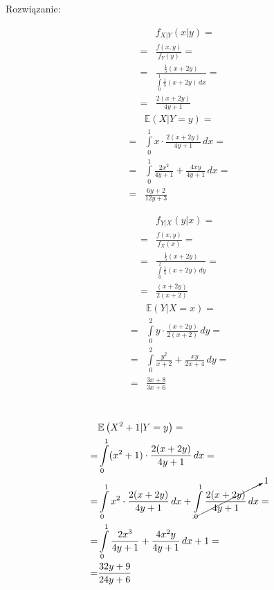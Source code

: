 Rozwiązanie:\\
\begin{minipage}[t]{0.5\linewidth}
\begin{align*}
&f_{X|Y}(x|y)
=\\=&
\frac{f(x,y)}{f_Y(y)}
=\\=&
\frac{\frac{1}{5}(x+2y)}{\int\limits_{0}^{1}\frac{1}{5}(x+2y)\,dx}
=\\=&
\frac{2(x+2y)}{4 y+1}
\end{align*}
\begin{align*}
&\mathbb E \left(X|Y=y\right)
=\\=&
\int\limits_{0}^{1}x\cdot \frac{2(x+2y)}{4 y+1}\,dx
=\\=&
\int\limits_{0}^{1}\frac{2 x^2}{4 y+1}+\frac{4 x y}{4 y+1}\,dx
=\\=&
\frac{6 y+2}{12 y+3}
\end{align*}
\end{minipage}
\begin{minipage}[t]{0.5\linewidth}
\begin{align*}
&f_{Y|X}(y|x)
=\\=&
\frac{f(x,y)}{f_X(x)}
=\\=&
\frac{\frac{1}{5}(x+2y)}{\int\limits_{0}^{2}\frac{1}{5}(x+2y)\,dy}
=\\=&
\frac{(x+2y)}{2 (x+2)}
\end{align*}
\begin{align*}
&\mathbb E \left(Y|X=x\right)
=\\=&
\int\limits_{0}^{2}y\cdot \frac{(x+2y)}{2 (x+2)}\,dy
=\\=&
\int\limits_{0}^{2}\frac{y^2}{x+2}+\frac{x y}{2 x+4}\,dy
=\\=&
\frac{3 x+8}{3 x+6}
\end{align*}
\end{minipage}\\
\begin{align*}
&\mathbb E \left(X^2+1|Y=y\right)
=\\=&
\int\limits_{0}^{1}
(x^2+1)\cdot\frac{2(x+2y)}{4 y+1}
\,dx
=\\=&
\int\limits_{0}^{1}
x^2\cdot\frac{2(x+2y)}{4 y+1}
\,dx
+
\cancelto{1}{\int\limits_{0}^{1}
\frac{2(x+2y)}{4 y+1}
\,dx}
=\\=&
\int\limits_{0}^{1}
\frac{2 x^3}{4 y+1}+\frac{4 x^2 y}{4 y+1}
\,dx
+1
=\\=&
\frac{32 y+9}{24 y+6}
\end{align*}